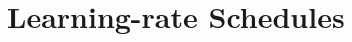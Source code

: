 \documentclass[aspectratio=169, 11pt]{beamer}
\newtheorem{algox}[theorem]{Algorithm}
\newcommand{\srcline}[1]{%
  \par\vspace{0.25em}%
  {\scriptsize\color{mcMuted}\hfill #1\par}}
\begin{document}

\section{Learning-rate Schedules}
\end{document}
